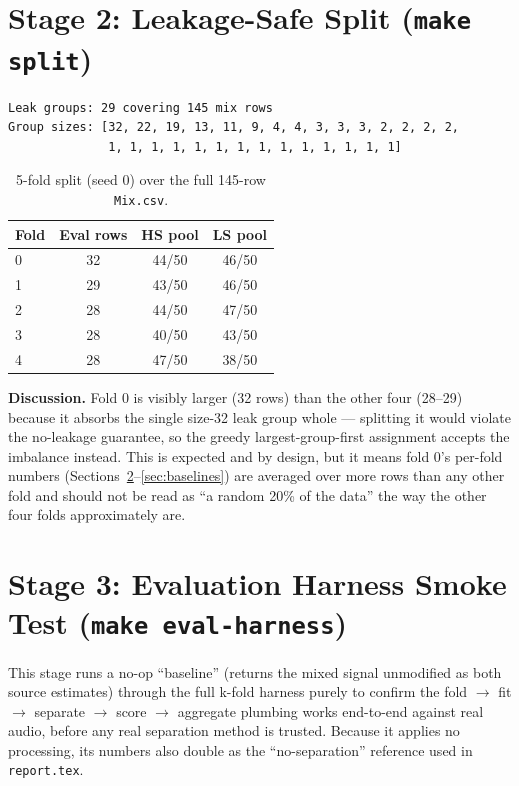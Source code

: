\documentclass[11pt]{article}
\begin{document}
\section{Stage 2: Leakage-Safe Split (\texttt{make split})}

\begin{verbatim}
Leak groups: 29 covering 145 mix rows
Group sizes: [32, 22, 19, 13, 11, 9, 4, 4, 3, 3, 3, 2, 2, 2, 2,
              1, 1, 1, 1, 1, 1, 1, 1, 1, 1, 1, 1, 1, 1]
\end{verbatim}

\begin{table}[H]
\centering
\caption{5-fold split (seed 0) over the full 145-row \texttt{Mix.csv}.}
\begin{tabular}{@{}lccc@{}}
\toprule
Fold & Eval rows & HS pool & LS pool \\
\midrule
0 & 32 & 44/50 & 46/50 \\
1 & 29 & 43/50 & 46/50 \\
2 & 28 & 44/50 & 47/50 \\
3 & 28 & 40/50 & 43/50 \\
4 & 28 & 47/50 & 38/50 \\
\bottomrule
\end{tabular}
\end{table}

\textbf{Discussion.} Fold 0 is visibly larger (32 rows) than the other four
(28--29) because it absorbs the single size-32 leak group whole ---
splitting it would violate the no-leakage guarantee, so the greedy
largest-group-first assignment accepts the imbalance instead. This is
expected and by design, but it means fold 0's per-fold numbers
(Sections~\ref{sec:evalharness}--\ref{sec:baselines}) are averaged over
more rows than any other fold and should not be read as ``a random 20\% of
the data'' the way the other four folds approximately are.

\section{Stage 3: Evaluation Harness Smoke Test (\texttt{make eval-harness})}
\label{sec:evalharness}

This stage runs a no-op ``baseline'' (returns the mixed signal unmodified as
both source estimates) through the full k-fold harness purely to confirm the
fold $\to$ fit $\to$ separate $\to$ score $\to$ aggregate plumbing works
end-to-end against real audio, before any real separation method is trusted.
Because it applies no processing, its numbers also double as the
``no-separation'' reference used in \texttt{report.tex}.
\end{document}
